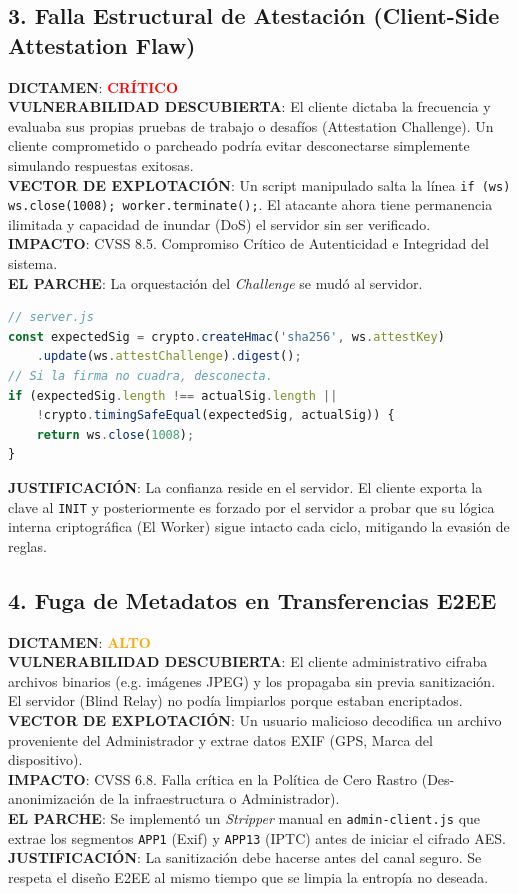 \documentclass[12pt,a4paper]{article}
\begin{document}
\subsection{3. Falla Estructural de Atestación (Client-Side Attestation Flaw)}
\textbf{DICTAMEN}: \textcolor{red}{\textbf{CRÍTICO}}\\
\textbf{VULNERABILIDAD DESCUBIERTA}: El cliente dictaba la frecuencia y evaluaba sus propias pruebas de trabajo o desafíos (Attestation Challenge). Un cliente comprometido o parcheado podría evitar desconectarse simplemente simulando respuestas exitosas.\\
\textbf{VECTOR DE EXPLOTACIÓN}: Un script manipulado salta la línea \texttt{if (ws) ws.close(1008); worker.terminate();}. El atacante ahora tiene permanencia ilimitada y capacidad de inundar (DoS) el servidor sin ser verificado.\\
\textbf{IMPACTO}: CVSS 8.5. Compromiso Crítico de Autenticidad e Integridad del sistema.\\
\textbf{EL PARCHE}: La orquestación del \textit{Challenge} se mudó al servidor.
\begin{lstlisting}[language=JavaScript]
// server.js
const expectedSig = crypto.createHmac('sha256', ws.attestKey)
    .update(ws.attestChallenge).digest();
// Si la firma no cuadra, desconecta.
if (expectedSig.length !== actualSig.length ||
    !crypto.timingSafeEqual(expectedSig, actualSig)) {
    return ws.close(1008);
}
\end{lstlisting}
\textbf{JUSTIFICACIÓN}: La confianza reside en el servidor. El cliente exporta la clave al \texttt{INIT} y posteriormente es forzado por el servidor a probar que su lógica interna criptográfica (El Worker) sigue intacto cada ciclo, mitigando la evasión de reglas.

\subsection{4. Fuga de Metadatos en Transferencias E2EE}
\textbf{DICTAMEN}: \textcolor{orange}{\textbf{ALTO}}\\
\textbf{VULNERABILIDAD DESCUBIERTA}: El cliente administrativo cifraba archivos binarios (e.g. imágenes JPEG) y los propagaba sin previa sanitización. El servidor (Blind Relay) no podía limpiarlos porque estaban encriptados.\\
\textbf{VECTOR DE EXPLOTACIÓN}: Un usuario malicioso decodifica un archivo proveniente del Administrador y extrae datos EXIF (GPS, Marca del dispositivo).\\
\textbf{IMPACTO}: CVSS 6.8. Falla crítica en la Política de Cero Rastro (Des-anonimización de la infraestructura o Administrador).\\
\textbf{EL PARCHE}:
Se implementó un \textit{Stripper} manual en \texttt{admin-client.js} que extrae los segmentos \texttt{APP1} (Exif) y \texttt{APP13} (IPTC) antes de iniciar el cifrado AES.
\textbf{JUSTIFICACIÓN}: La sanitización debe hacerse antes del canal seguro. Se respeta el diseño E2EE al mismo tiempo que se limpia la entropía no deseada.
\end{document}
